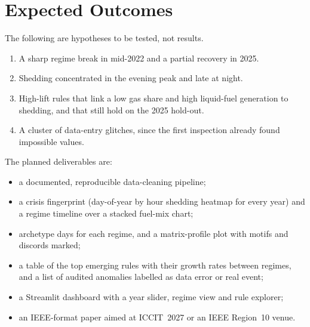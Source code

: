 \documentclass[10pt,a4paper]{article}
\begin{document}
\section{Expected Outcomes}
The following are hypotheses to be tested, not results.
\begin{enumerate}
  \item A sharp regime break in mid-2022 and a partial recovery in 2025.
  \item Shedding concentrated in the evening peak and late at night.
  \item High-lift rules that link a low gas share and high liquid-fuel generation to shedding, and that still hold on the 2025 hold-out.
  \item A cluster of data-entry glitches, since the first inspection already found impossible values.
\end{enumerate}
The planned deliverables are:
\begin{itemize}
  \item a documented, reproducible data-cleaning pipeline;
  \item a crisis fingerprint (day-of-year by hour shedding heatmap for every year) and a regime timeline over a stacked fuel-mix chart;
  \item archetype days for each regime, and a matrix-profile plot with motifs and discords marked;
  \item a table of the top emerging rules with their growth rates between regimes, and a list of audited anomalies labelled as data error or real event;
  \item a Streamlit dashboard with a year slider, regime view and rule explorer;
  \item an IEEE-format paper aimed at ICCIT~2027 or an IEEE Region~10 venue.
\end{itemize}


\end{document}
